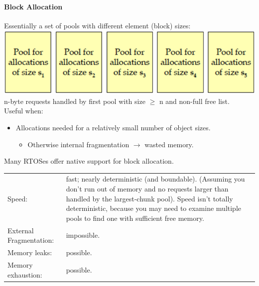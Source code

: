 \paragraph{Block Allocation}
Essentially a set of pools with different element (block) sizes:
\includegraphics[width=0.5\linewidth]{images/AdvancedCPP/blockAllocation}
n-byte requests handled by first pool with size $\geq$ n and non-full free list.\\
Useful when:
\begin{itemize}
  \item Allocations needed for a relatively small number of object sizes.
  \begin{itemize}
    \item Otherwise internal fragmentation $\rightarrow$ wasted memory.
  \end{itemize}
\end{itemize}
Many RTOSes offer native support for block allocation.

\begin{tabular}{|l|p{7cm}|}
  \hline
  Speed: & fast; nearly deterministic (and boundable). (Assuming you don't run out of memory and no requests larger than handled by the largest-chunk pool). Speed isn't totally deterministic, because you may need to examine multiple pools to find one with sufficient free memory.\\
  External Fragmentation: & impossible.\\
  Memory leaks: & possible.\\
  Memory exhaustion: & possible.\\
  \hline
\end{tabular}

